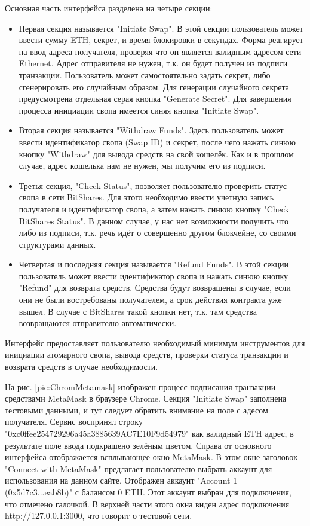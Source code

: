 Основная часть интерфейса разделена на четыре секции:
\begin{itemize}
\item Первая секция называется "Initiate Swap". В этой секции пользователь может ввести сумму ETH, секрет, и время блокировки в секундах. Форма реагирует на ввод адреса получателя, проверяя что он является валидным адресом сети Ethernet. Адрес отправителя не нужен, т.к. он будет получен из подписи транзакции. Пользователь может самостоятельно задать секрет, либо сгенерировать его случайным образом. Для генерации случайного секрета предусмотрена отдельная серая кнопка "Generate Secret". Для завершения процесса инициации свопа имеется синяя кнопка "Initiate Swap".

\item Вторая секция называется "Withdraw Funds". Здесь пользователь может ввести идентификатор свопа (Swap ID) и секрет, после чего нажать синюю кнопку "Withdraw" для вывода средств на свой кошелёк. Как и в прошлом случае, адрес кошелька нам не нужен, мы получим его из подписи.

\item Третья секция, "Check Status", позволяет пользователю проверить статус свопа в сети BitShares. Для этого необходимо ввести учетную запись получателя и идентификатор свопа, а затем нажать синюю кнопку "Check BitShares Status". В данном случае, у нас нет возможности получить что либо из подписи, т.к. речь идёт о совершенно другом блокчейне, со своими структурами данных.

\item Четвертая и последняя секция называется "Refund Funds". В этой секции пользователь может ввести идентификатор свопа и нажать синюю кнопку "Refund" для возврата средств. Средства будут возвращены в случае, если они не были востребованы получателем, а срок действия контракта уже вышел. В случае с BitShares такой кнопки нет, т.к. там средства возвращаются отправителю автоматически.
\end{itemize}

Интерфейс предоставляет пользователю необходимый минимум инструментов для инициации атомарного свопа, вывода средств, проверки статуса транзакции и возврата средств в случае необходимости.

На рис. \ref{pic:ChromMetamask} изображен процесс подписания транзакции средствами MetaMask в браузере Chrome. Секция "Initiate Swap" заполнена тестовыми данными, и тут следует обратить внимание на поле с адесом получателя. Сервис воспринял строку "0xc0ffee254729296a45a3885639AC7E10F9d54979" как валидный ETH адрес, в результате поле ввода подкрашено зелёным цветом. Справа от основного интерфейса отображается всплывающее окно MetaMask. В этом окне заголовок "Connect with MetaMask" предлагает пользователю выбрать аккаунт для использования на данном сайте. Отображен аккаунт "Account 1 (0x5d7c3...eab8b)" с балансом 0 ETH. Этот аккаунт выбран для подключения, что отмечено галочкой. В верхней части этого окна виден адрес подключения http://127.0.0.1:3000, что говорит о тестовой сети.

